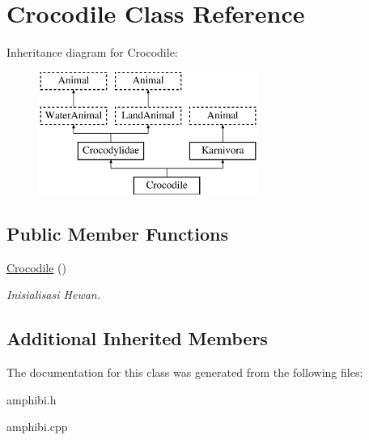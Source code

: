 \hypertarget{class_crocodile}{}\section{Crocodile Class Reference}
\label{class_crocodile}
Inheritance diagram for Crocodile\+:\begin{figure}[H]
\begin{center}
\leavevmode
\includegraphics[height=4.000000cm]{class_crocodile}
\end{center}
\end{figure}
\subsection*{Public Member Functions}
\begin{DoxyCompactItemize}
\item 
\hyperlink{class_crocodile_a2396e87ee26959bd3bded77fac83865f}{Crocodile} ()\hypertarget{class_crocodile_a2396e87ee26959bd3bded77fac83865f}{}\label{class_crocodile_a2396e87ee26959bd3bded77fac83865f}

\begin{DoxyCompactList}\small\item\em Inisialisasi Hewan. \end{DoxyCompactList}\end{DoxyCompactItemize}
\subsection*{Additional Inherited Members}


The documentation for this class was generated from the following files\+:\begin{DoxyCompactItemize}
\item 
amphibi.\+h\item 
amphibi.\+cpp\end{DoxyCompactItemize}
